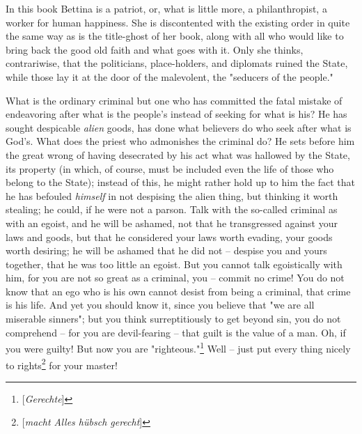 In this book Bettina is a patriot, or, what is little more, a philanthropist, 
a worker for human happiness. She is discontented with the existing order in 
quite the same way as is the title-ghost of her book, along with all who would 
like to bring back the good old faith and what goes with it. Only she thinks, 
contrariwise, that the politicians, place-holders, and diplomats ruined the 
State, while those lay it at the door of the malevolent, the "{}seducers of 
the people."{}

What is the ordinary criminal but one who has committed the fatal mistake of 
endeavoring after what is the people's instead of seeking for what is his? He 
has sought despicable \textit{alien} goods, has done what believers do who 
seek after what is God's. What does the priest who admonishes the criminal do? 
He sets before him the great wrong of having desecrated by his act what was 
hallowed by the State, its property (in which, of course, must be included 
even the life of those who belong to the State); instead of this, he might 
rather hold up to him the fact that he has befouled \textit{himself} in not 
despising the alien thing, but thinking it worth stealing; he could, if he 
were not a parson. Talk with the so-called criminal as with an egoist, and he 
will be ashamed, not that he transgressed against your laws and goods, but 
that he considered your laws worth evading, your goods worth desiring; he will 
be ashamed that he did not -- despise you and yours together, that he was too 
little an egoist. But you cannot talk egoistically with him, for you are not 
so great as a criminal, you -- commit no crime! You do not know that an ego 
who is his own cannot desist from being a criminal, that crime is his life. 
And yet you should know it, since you believe that "{}we are all miserable 
sinners"{}; but you think surreptitiously to get beyond sin, you do not 
comprehend -- for you are devil-fearing -- that guilt is the value of a man. 
Oh, if you were guilty! But now you are 
"{}righteous."{}\footnote{[\textit{Gerechte}]} Well -- just put every thing 
nicely to rights\footnote{[\textit{macht Alles h\"ubsch gerecht}]} for your 
master!

